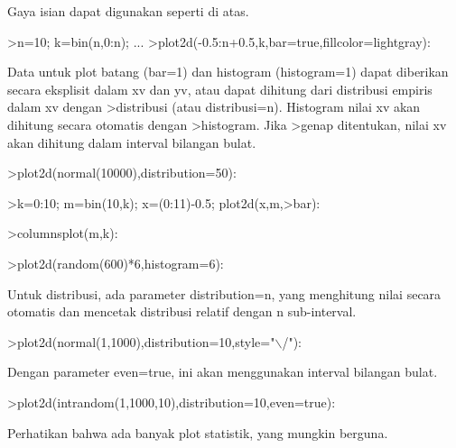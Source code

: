 \documentclass[a4paper,10pt]{article}
\begin{document}
\begin{eulernotebook}
\begin{eulercomment}
\begin{eulercomment}
\begin{eulercomment}
\begin{eulercomment}
\begin{eulercomment}
Gaya isian dapat digunakan seperti di atas.
\end{eulercomment}
\begin{eulerprompt}
>n=10; k=bin(n,0:n); ...
>plot2d(-0.5:n+0.5,k,bar=true,fillcolor=lightgray):
\end{eulerprompt}
\begin{eulercomment}
Data untuk plot batang (bar=1) dan histogram (histogram=1) dapat
diberikan secara eksplisit dalam xv dan yv, atau dapat dihitung dari
distribusi empiris dalam xv dengan \textgreater{}distribusi (atau distribusi=n).
Histogram nilai xv akan dihitung secara otomatis dengan \textgreater{}histogram.
Jika \textgreater{}genap ditentukan, nilai xv akan dihitung dalam interval bilangan
bulat.
\end{eulercomment}
\begin{eulerprompt}
>plot2d(normal(10000),distribution=50):
\end{eulerprompt}
\begin{eulerprompt}
>k=0:10; m=bin(10,k); x=(0:11)-0.5; plot2d(x,m,>bar):
\end{eulerprompt}
\begin{eulerprompt}
>columnsplot(m,k):
\end{eulerprompt}
\begin{eulerprompt}
>plot2d(random(600)*6,histogram=6):
\end{eulerprompt}
\begin{eulercomment}
Untuk distribusi, ada parameter distribution=n, yang menghitung nilai
secara otomatis dan mencetak distribusi relatif dengan n sub-interval.
\end{eulercomment}
\begin{eulerprompt}
>plot2d(normal(1,1000),distribution=10,style="\(\backslash\)/"):
\end{eulerprompt}
\begin{eulercomment}
Dengan parameter even=true, ini akan menggunakan interval bilangan
bulat.
\end{eulercomment}
\begin{eulerprompt}
>plot2d(intrandom(1,1000,10),distribution=10,even=true):
\end{eulerprompt}
\begin{eulercomment}
Perhatikan bahwa ada banyak plot statistik, yang mungkin berguna.

\end{eulercomment}
\end{eulercomment}
\end{eulercomment}
\end{eulercomment}
\end{eulercomment}
\end{eulernotebook}
\end{document}
